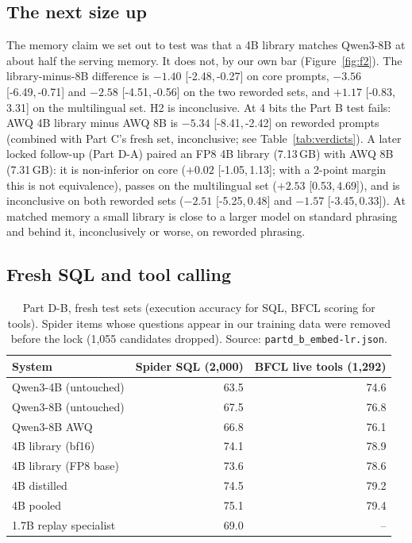 \documentclass[11pt]{article}
\newcommand{\ci}[2]{[#1,\allowbreak\,#2]}
\begin{document}
\subsection{The next size up}
\label{sec:size}
The memory claim we set out to test was that a 4B library matches Qwen3-8B at about half the serving memory. It does
not, by our own bar (Figure~\ref{fig:f2}). The library-minus-8B difference is $-1.40$ \ci{-2.48}{-0.27} on core
prompts, $-3.56$ \ci{-6.49}{-0.71} and $-2.58$ \ci{-4.51}{-0.56} on the two reworded sets, and $+1.17$
\ci{-0.83}{3.31} on the multilingual set. H2 is inconclusive. At 4 bits the Part B test fails: AWQ 4B library minus
AWQ 8B is $-5.34$ \ci{-8.41}{-2.42} on reworded prompts (combined with Part C's fresh set, inconclusive; see
Table~\ref{tab:verdicts}). A later locked follow-up (Part D-A) paired an FP8 4B library
(7.13\,GB) with AWQ 8B (7.31\,GB): it is non-inferior on core ($+0.02$ \ci{-1.05}{1.13}; with a 2-point margin this
is not equivalence), passes on the multilingual set ($+2.53$ \ci{0.53}{4.69}), and is inconclusive on both reworded
sets ($-2.51$ \ci{-5.25}{0.48} and $-1.57$ \ci{-3.45}{0.33}). At matched memory a small library is close to a larger
model on standard phrasing and behind it, inconclusively or worse, on reworded phrasing.

\subsection{Fresh SQL and tool calling}
\label{sec:fresh}

\begin{table}[t]
\centering
\small
\begin{tabular}{lrr}
\toprule
System & Spider SQL (2,000) & BFCL live tools (1,292) \\
\midrule
Qwen3-4B (untouched) & 63.5 & 74.6 \\
Qwen3-8B (untouched) & 67.5 & 76.8 \\
Qwen3-8B AWQ & 66.8 & 76.1 \\
4B library (bf16) & 74.1 & 78.9 \\
4B library (FP8 base) & 73.6 & 78.6 \\
4B distilled & 74.5 & 79.2 \\
4B pooled & 75.1 & 79.4 \\
1.7B replay specialist & 69.0 & -- \\
\bottomrule
\end{tabular}
\caption{Part D-B, fresh test sets (execution accuracy for SQL, BFCL scoring for tools). Spider items whose
questions appear in our training data were removed before the lock (1,055 candidates dropped). Source:
\texttt{partd\_b\_embed-lr.json}.}
\label{tab:fresh}
\end{table}
\end{document}
